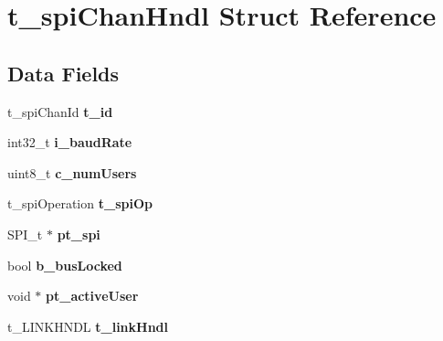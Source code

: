 \hypertarget{structt__spi_chan_hndl}{\section{t\-\_\-spi\-Chan\-Hndl Struct Reference}
\label{structt__spi_chan_hndl}
}
\subsection*{Data Fields}
\begin{DoxyCompactItemize}
\item 
\hypertarget{structt__spi_chan_hndl_aec5d7521c4a29f82a571d82021edd528}{t\-\_\-spi\-Chan\-Id {\bfseries t\-\_\-id}}\label{structt__spi_chan_hndl_aec5d7521c4a29f82a571d82021edd528}

\item 
\hypertarget{structt__spi_chan_hndl_a6616035bfad2a509244b7fc44e8604b5}{int32\-\_\-t {\bfseries i\-\_\-baud\-Rate}}\label{structt__spi_chan_hndl_a6616035bfad2a509244b7fc44e8604b5}

\item 
\hypertarget{structt__spi_chan_hndl_a65907c8d88006e5cdc5e6b18eb4606ba}{uint8\-\_\-t {\bfseries c\-\_\-num\-Users}}\label{structt__spi_chan_hndl_a65907c8d88006e5cdc5e6b18eb4606ba}

\item 
\hypertarget{structt__spi_chan_hndl_a9fdac7dfe9cccf3055f8cc674adef81f}{t\-\_\-spi\-Operation {\bfseries t\-\_\-spi\-Op}}\label{structt__spi_chan_hndl_a9fdac7dfe9cccf3055f8cc674adef81f}

\item 
\hypertarget{structt__spi_chan_hndl_a3ad09c248f0349fc1f4067bfa0d5de15}{S\-P\-I\-\_\-t $\ast$ {\bfseries pt\-\_\-spi}}\label{structt__spi_chan_hndl_a3ad09c248f0349fc1f4067bfa0d5de15}

\item 
\hypertarget{structt__spi_chan_hndl_afba21fd5d0867de3ab2c432c30a539c5}{bool {\bfseries b\-\_\-bus\-Locked}}\label{structt__spi_chan_hndl_afba21fd5d0867de3ab2c432c30a539c5}

\item 
\hypertarget{structt__spi_chan_hndl_aa8089f66c385d331f59903ac82c62459}{void $\ast$ {\bfseries pt\-\_\-active\-User}}\label{structt__spi_chan_hndl_aa8089f66c385d331f59903ac82c62459}

\item 
\hypertarget{structt__spi_chan_hndl_ac579254cd5dce41d6f399dc86abda589}{t\-\_\-\-L\-I\-N\-K\-H\-N\-D\-L {\bfseries t\-\_\-link\-Hndl}}\label{structt__spi_chan_hndl_ac579254cd5dce41d6f399dc86abda589}


\end{DoxyCompactItemize}
